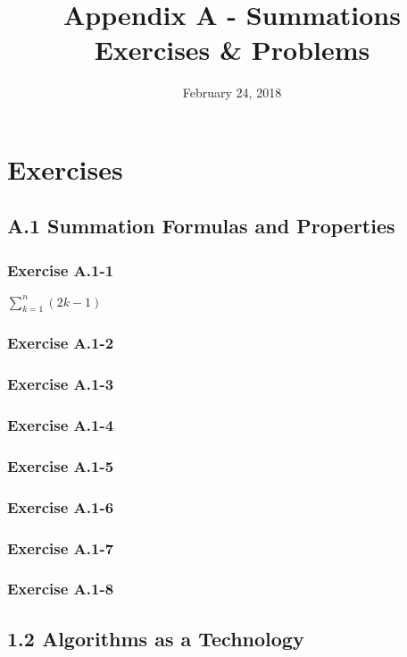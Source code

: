 \documentclass{article}
\title{Appendix A - Summations\\
Exercises \& Problems}
\date{February 24, 2018}
\begin{document}
\maketitle
{}

\section*{Exercises}

\subsection*{A.1 Summation Formulas and Properties}
\subsubsection*{Exercise A.1-1}

$\sum_{k=1}^{n}(2k-1)$

\subsubsection*{Exercise A.1-2}


\subsubsection*{Exercise A.1-3}


\subsubsection*{Exercise A.1-4}


\subsubsection*{Exercise A.1-5}
\subsubsection*{Exercise A.1-6}
\subsubsection*{Exercise A.1-7}
\subsubsection*{Exercise A.1-8}


\subsection*{1.2 Algorithms as a Technology}
\end{document}
